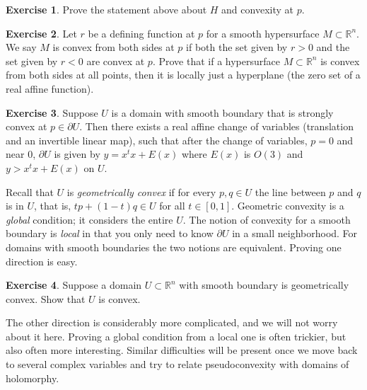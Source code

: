 \documentclass[12pt,openany]{book}
\newcommand{\R}{{\mathbb{R}}}
\newcommand{\myindex}[1]{#1\index{#1}}
\theoremstyle{plain}
\theoremstyle{remark}
\theoremstyle{definition}
\newenvironment{exbox}{%
    \def\FrameCommand{\vrule width 1pt \relax\hspace{10pt}}%
    \MakeFramed{\advance\hsize-\width\FrameRestore}%
}{%
    \endMakeFramed
}
\theoremstyle{exercise}
\newtheorem{exercise}{Exercise}[section]
\theoremstyle{example}
\begin{document}
\begin{exbox}
\begin{exercise}
Prove the statement above about $H$ and convexity at $p$.
\end{exercise}

\begin{exercise}
Let $r$ be a defining function at $p$ for a smooth hypersurface
$M \subset \R^n$.
We say $M$ is convex from both sides at $p$ if both the set given by
$r > 0$ and the set given by $r < 0$ are convex at $p$.
Prove that if a hypersurface $M \subset \R^n$ is convex from both sides at all
points, then it is locally just a hyperplane (the zero set of a real affine
function).
\end{exercise}

\begin{exercise}
Suppose $U$ is a domain with smooth boundary that is strongly convex
at $p \in \partial U$.
Then there exists a real affine change of variables (translation and an
invertible linear map), such that after the change of variables, $p=0$ and near $0$, $\partial U$ is given by
$y = x^t x + E(x)$ where $E(x)$ is $O(3)$ and
$y > x^tx + E(x)$ on $U$.
\end{exercise}
\end{exbox}

Recall that $U$ is
\emph{\myindex{geometrically convex}}
if for every $p,q \in U$ the
line between $p$ and $q$ is in $U$, that is,
$tp +(1-t)q \in U$ for all $t \in [0,1]$.
Geometric convexity is a \emph{global} condition; it considers
the entire $U$.  The notion of convexity for a smooth boundary is
\emph{local} in that you only need to know $\partial U$ in a small
neighborhood.  For domains with
smooth boundaries the two notions are equivalent.  Proving
one direction is easy.

\begin{exbox}
\begin{exercise}
Suppose a domain $U \subset \R^n$ with smooth
boundary is geometrically
convex.  Show that $U$ is convex.
\end{exercise}
\end{exbox}

The other direction is considerably more complicated, and we will not worry
about it here.  Proving a global condition from a local one is often
trickier, but also often more interesting.
Similar difficulties will be present once we move back to
several complex variables and try to relate pseudoconvexity with domains of
holomorphy.
\end{document}
